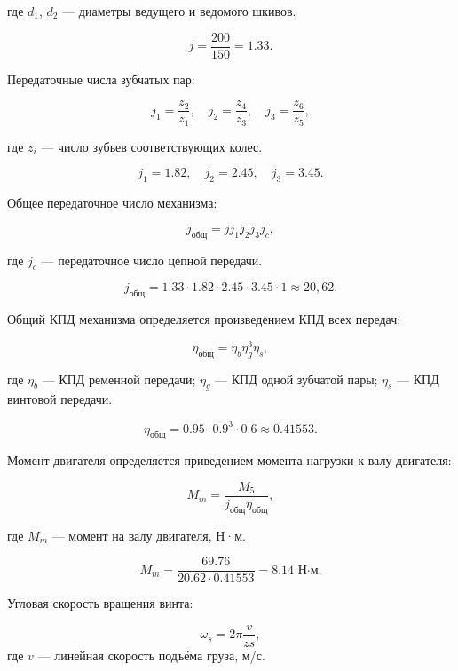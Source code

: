 \documentclass[a4paper, 14pt]{extarticle}
\begin{document}
	где $d_1$, $d_2$ — диаметры ведущего и ведомого шкивов.
	
	\[
	j = \frac{200}{150} = 1.33.
	\]
	
	Передаточные числа зубчатых пар:
	
	\begin{equation}
		j_1 = \frac{z_2}{z_1}, \quad
		j_2 = \frac{z_4}{z_3}, \quad
		j_3 = \frac{z_6}{z_5},
		\label{eq6}
	\end{equation}
	
	где $z_i$ — число зубьев соответствующих колес.
	
	\[
	j_1 = 1.82, \quad
	j_2 = 2.45, \quad
	j_3 = 3.45.
	\]
	
	Общее передаточное число механизма:
	
	\begin{equation}
		j_{\text{общ}} = j j_1 j_2 j_3 j_{c},
		\label{eq7}
	\end{equation}
	
	где $j_{c}$ — передаточное число цепной передачи.
	
	\[
	j_{\text{общ}} = 1.33 \cdot 1.82 \cdot 2.45 \cdot 3.45\cdot 1
	\approx 20,62.
	\]
	
	
	Общий КПД механизма определяется произведением КПД всех передач:
	
	\begin{equation}
		\eta_{\text{общ}} =
		\eta_b \eta_g^3 \eta_s,
		\label{eq8}
	\end{equation}
	
	где $\eta_b$ — КПД ременной передачи;  
	$\eta_g$ — КПД одной зубчатой пары;  
	$\eta_s$ — КПД винтовой передачи.
	
	\[
	\eta_{\text{общ}}
	=
	0.95 \cdot 0.9^3 \cdot 0.6 
	\approx 0.41553.
	\]
	
	
	Момент двигателя определяется приведением момента нагрузки к валу двигателя:
	
	\begin{equation}
		M_m =
		\frac{M_5}{j_{\text{общ}} \eta_{\text{общ}}},
		\label{eq9}
	\end{equation}
	
	где $M_m$ — момент на валу двигателя, Н·м.
	
	\[
	M_m =
	\frac{69.76}{20.62 \cdot 0.41553}
	= 8.14 \text{ Н·м}.
	\]
	
	Угловая скорость вращения винта:
	
	\begin{equation}
		\omega_s = 2\pi \frac{v}{zs},
		\label{eq11}
	\end{equation}
	где $v$ — линейная скорость подъёма груза, м/с.
	
\end{document}
